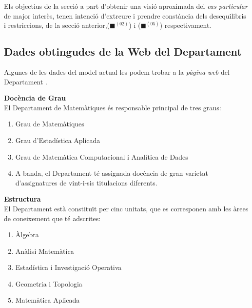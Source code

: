 \documentclass[10pt,twocolumn]{article}
\begin{document}
Els objectius de la secció a  part d'obtenir una visió aproximada del \textit{cas particular} de major interès, tenen intenció d'extreure i prendre constància dels desequilibris i restriccions, de la secció anterior,({\color{blue!60}$\blacksquare$}$^{(02)}$) i ({\color{violet!60}$\blacksquare$}$^{(05)}$)  respectivament. 
\\

\subsection{Dades obtingudes de la Web del Departament}
Algunes de les dades del model actual les podem trobar a la \textit{pàgina web} del Departament \cite{webdep}.

\vspace{3mm}

\begin{tcolorbox}[colback=black!1,title=\textbf{Dades publiques a la web},coltitle=black,colbacktitle=black!10]
\textbf{Docència de Grau}\\
El Departament de Matemàtiques és responsable principal de tres graus:
	\begin{enumerate}
		\item Grau de Matemàtiques
		\item Grau d'Estadística Aplicada
		\item Grau de Matemàtica Computacional i Analítica de Dades
		\item A banda, el Departament té assignada docència de gran varietat d'assignatures de vint-i-sis titulacions diferents.
	\end{enumerate}
	\textbf{Estructura}\\
	El Departament està constituït per cinc unitats, que es corresponen amb les àrees de coneixement que té adscrites:
	\begin{enumerate}
		\item Àlgebra
		\item Anàlisi Matemàtica
		\item Estadística i Investigació Operativa
		\item Geometria i Topologia
		\item Matemàtica Aplicada
	\end{enumerate}
\end{tcolorbox}
\end{document}
